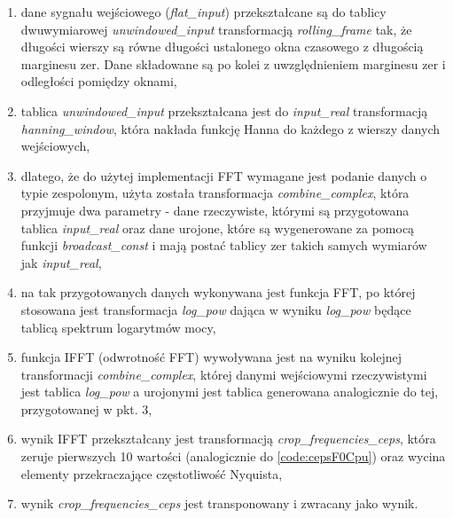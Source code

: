 \documentclass[12pt,a4paper,twoside]{mwart}
\begin{document}
\begin{enumerate}
  \item dane sygnału wejściowego (\textit{flat\_input}) przekształcane są do tablicy dwuwymiarowej \textit{unwindowed\_input} transformacją \textit{rolling\_frame} tak, że długości wierszy są równe długości ustalonego okna czasowego z długością marginesu zer. Dane składowane są po kolei z uwzględnieniem marginesu zer i odległości pomiędzy oknami,
  \item tablica \textit{unwindowed\_input} przekształcana jest do \textit{input\_real} transformacją \\\textit{hanning\_window}, która nakłada funkcję Hanna do każdego z wierszy danych wejściowych,
  \item dlatego, że do użytej implementacji FFT wymagane jest podanie danych o typie zespolonym, użyta została transformacja \textit{combine\_complex}, która przyjmuje dwa parametry - dane rzeczywiste, którymi są przygotowana tablica \textit{input\_real} oraz dane urojone, które są wygenerowane za pomocą funkcji \textit{broadcast\_const} i mają postać tablicy zer takich samych wymiarów jak \textit{input\_real},
  \item na tak przygotowanych danych wykonywana jest funkcja FFT, po której stosowana jest transformacja \textit{log\_pow} dająca w wyniku \textit{log\_pow} będące tablicą spektrum logarytmów mocy,
  \item funkcja IFFT (odwrotność FFT) wywoływana jest na wyniku kolejnej transformacji \textit{combine\_complex}, której danymi wejściowymi rzeczywistymi jest tablica \textit{log\_pow} a urojonymi jest tablica generowana analogicznie do tej, przygotowanej w pkt. 3,
  \item wynik IFFT przekształcany jest transformacją \textit{crop\_frequencies\_ceps}, która zeruje pierwszych 10 wartości (analogicznie do \ref{code:cepsF0Cpu}) oraz wycina elementy przekraczające częstotliwość Nyquista,
  \item wynik \textit{crop\_frequencies\_ceps} jest transponowany i zwracany jako wynik.
\end{enumerate}
\end{document}

